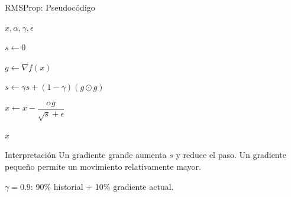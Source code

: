 \begin{frame}{RMSProp: Pseudocódigo}

\small

\begin{algorithmic}[1]

\Require $x,\alpha,\gamma,\epsilon$

\State $s\gets0$


    \State $g\gets\nabla f(x)$

    \State
    $s\gets
    \gamma s+(1-\gamma)(g\odot g)$

    \State
    $x\gets
    x-\dfrac{\alpha g}{\sqrt{s}+\epsilon}$

\EndWhile

\State \Return $x$

\end{algorithmic}

\vspace{0.35cm}

\begin{block}{Interpretación}
Un gradiente grande aumenta $s$ y reduce el paso.
Un gradiente pequeño permite un movimiento relativamente mayor.
\end{block}

\begin{center}
\footnotesize
$\gamma=0.9$:
90\% historial + 10\% gradiente actual.
\end{center}

\end{frame}


